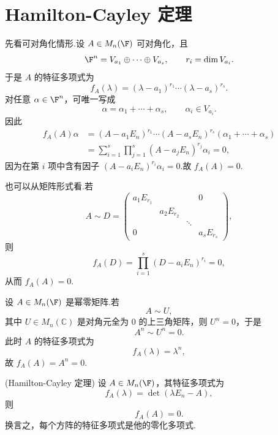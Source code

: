 \section{Hamilton-Cayley 定理}


\begin{example}
	先看可对角化情形.设 $A\in M_n(\F)$ 可对角化，且
\[
\F^n=V_{a_1}\oplus\cdots\oplus V_{a_s},
\qquad r_i=\dim V_{a_i}.
\]
于是 $A$ 的特征多项式为
\[
f_A(\lambda)=(\lambda-a_1)^{r_1}\cdots(\lambda-a_s)^{r_s}.
\]
对任意 $\alpha\in\F^n$，可唯一写成
\[
\alpha=\alpha_1+\cdots+\alpha_s,
\qquad \alpha_i\in V_{a_i}.
\]
因此
\[
\begin{aligned}
	f_A(A)\alpha
	&=(A-a_1E_n)^{r_1}\cdots(A-a_sE_n)^{r_s}
	(\alpha_1+\cdots+\alpha_s)       \\
	&=\sum_{i=1}^s
	\prod_{j=1}^s (A-a_jE_n)^{r_j}\alpha_i=0,
\end{aligned}
\]
因为在第 $i$ 项中含有因子 $(A-a_iE_n)^{r_i}\alpha_i=0$.故 $f_A(A)=0$.

也可以从矩阵形式看.若
\[
A\sim D=\begin{pmatrix}
	a_1E_{r_1}&&&0\\
	&a_2E_{r_2}&&\\
	&&\ddots&\\
	0&&&a_sE_{r_s}
\end{pmatrix},
\]
则
\[
f_A(D)=\prod_{i=1}^s (D-a_iE_n)^{r_i}=0,
\]
从而 $f_A(A)=0$.
\end{example}

\begin{example}
设 $A\in M_n(\F)$ 是幂零矩阵.若
\[
A\sim U,
\]
其中 $U\in M_n(\mathbb C)$ 是对角元全为 $0$ 的上三角矩阵，则 $U^n=0$，于是
\[
A^n\sim U^n=0.
\]
此时 $A$ 的特征多项式为
\[
f_A(\lambda)=\lambda^n,
\]
故 $f_A(A)=A^n=0$.
\end{example}

\begin{theorem}(Hamilton-Cayley 定理)
设 $A\in M_n(\F)$，其特征多项式为
\[
f_A(\lambda)=\det(\lambda E_n-A),
\]
则
\[
f_A(A)=0.
\]
换言之，每个方阵的特征多项式是他的零化多项式.
\end{theorem}

